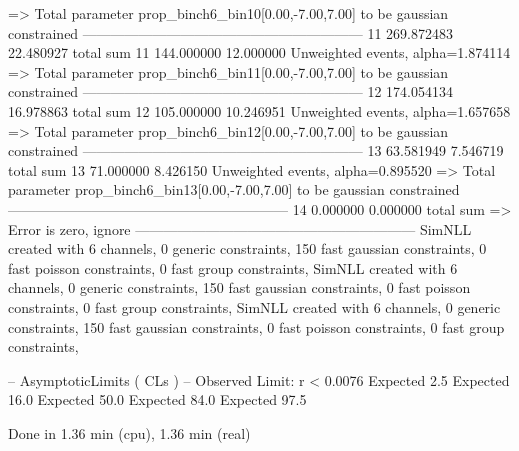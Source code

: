   => Total parameter prop_binch6_bin10[0.00,-7.00,7.00] to be gaussian constrained
------------------------------------------------------------
11         269.872483      22.480927       total sum                     
11         144.000000      12.000000       Unweighted events, alpha=1.874114
  => Total parameter prop_binch6_bin11[0.00,-7.00,7.00] to be gaussian constrained
------------------------------------------------------------
12         174.054134      16.978863       total sum                     
12         105.000000      10.246951       Unweighted events, alpha=1.657658
  => Total parameter prop_binch6_bin12[0.00,-7.00,7.00] to be gaussian constrained
------------------------------------------------------------
13         63.581949       7.546719        total sum                     
13         71.000000       8.426150        Unweighted events, alpha=0.895520
  => Total parameter prop_binch6_bin13[0.00,-7.00,7.00] to be gaussian constrained
------------------------------------------------------------
14         0.000000        0.000000        total sum                     
  => Error is zero, ignore      
------------------------------------------------------------
SimNLL created with 6 channels, 0 generic constraints, 150 fast gaussian constraints, 0 fast poisson constraints, 0 fast group constraints, 
SimNLL created with 6 channels, 0 generic constraints, 150 fast gaussian constraints, 0 fast poisson constraints, 0 fast group constraints, 
SimNLL created with 6 channels, 0 generic constraints, 150 fast gaussian constraints, 0 fast poisson constraints, 0 fast group constraints, 

 -- AsymptoticLimits ( CLs ) --
Observed Limit: r < 0.0076
Expected  2.5%
Expected 16.0%
Expected 50.0%
Expected 84.0%
Expected 97.5%

Done in 1.36 min (cpu), 1.36 min (real)
